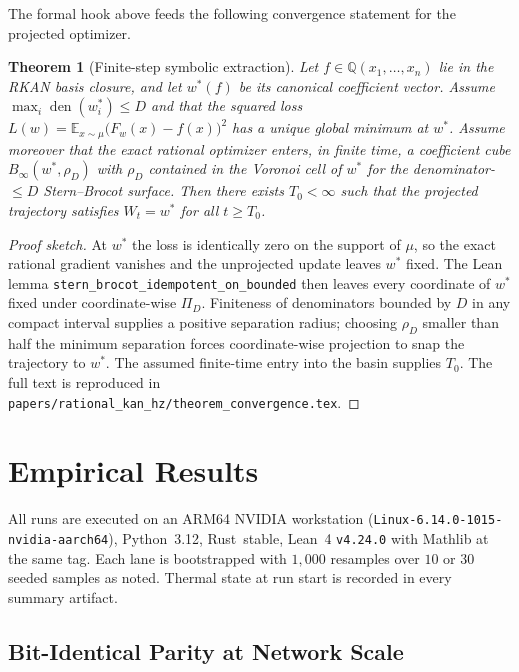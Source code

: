 \documentclass[11pt,a4paper]{article}
\newtheorem{theorem}{Theorem}
\begin{document}
The formal hook above feeds the following convergence statement for the
projected optimizer.

\begin{theorem}[Finite-step symbolic extraction]\label{thm:convergence}
Let $f \in \mathbb{Q}(x_{1},\ldots,x_{n})$ lie in the RKAN basis closure,
and let $w^{\ast}(f)$ be its canonical coefficient vector. Assume
$\max_{i} \operatorname{den}(w_{i}^{\ast}) \leq D$ and that the squared
loss
$L(w) = \mathbb{E}_{x \sim \mu} \bigl(F_{w}(x) - f(x)\bigr)^{2}$ has a
unique global minimum at $w^{\ast}$. Assume moreover that the exact
rational optimizer enters, in finite time, a coefficient cube
$B_{\infty}(w^{\ast}, \rho_{D})$ with $\rho_{D}$ contained in the
Voronoi cell of $w^{\ast}$ for the denominator-$\leq D$ Stern--Brocot
surface. Then there exists $T_{0} < \infty$ such that the projected
trajectory satisfies $W_{t} = w^{\ast}$ for all $t \geq T_{0}$.
\end{theorem}

\begin{proof}[Proof sketch]
At $w^{\ast}$ the loss is identically zero on the support of $\mu$, so
the exact rational gradient vanishes and the unprojected update leaves
$w^{\ast}$ fixed. The Lean lemma
\texttt{stern\_brocot\_idempotent\_on\_bounded} then leaves every
coordinate of $w^{\ast}$ fixed under coordinate-wise $\Pi_{D}$.
Finiteness of denominators bounded by $D$ in any compact interval
supplies a positive separation radius; choosing $\rho_{D}$ smaller
than half the minimum separation forces coordinate-wise projection to
snap the trajectory to $w^{\ast}$. The assumed finite-time entry into
the basin supplies $T_{0}$. The full text is reproduced in
\texttt{papers/rational\_kan\_hz/theorem\_convergence.tex}.
\end{proof}

\section{Empirical Results}
\label{sec:empirical}

All runs are executed on an ARM64 NVIDIA workstation
(\texttt{Linux-6.14.0-1015-nvidia-aarch64}), Python~3.12, Rust~stable,
Lean~4 \texttt{v4.24.0} with Mathlib at the same tag. Each lane is
bootstrapped with $1{,}000$ resamples over $10$ or $30$ seeded samples
as noted. Thermal state at run start is recorded in every summary
artifact.

\subsection{Bit-Identical Parity at Network Scale}
\end{document}
